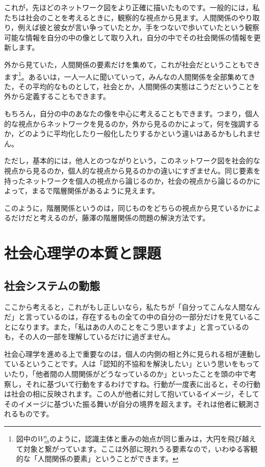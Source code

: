 \documentclass{ltjsbook}
\begin{document}
これが，先ほどのネットワーク図をより正確に描いたものです。一般的には，私たちは社会のことを考えるときに，観察的な視点から見ます。人間関係のやり取り，例えば彼と彼女が言い争っていたとか，手をつないで歩いていたという観察可能な情報を自分の中の像として取り入れ，自分の中でその社会関係の情報を更新します。

外から見ていた，人間関係の要素だけを集めて，これが社会だということもできます\footnote{図中の$W_{ab}^{a}$のように，認識主体と重みの始点が同じ重みは，大円を飛び越えて対象と繋がっています。ここは外部に現れうる要素なので，いわゆる客観的な「人間関係の要素」ということができます。}。あるいは，一人一人に聞いていって，みんなの人間関係を全部集めてきた，その平均的なものとして，社会とか，人間関係の実態はこうだということを外から定義することもできます。

もちろん，自分の中のあなたの像を中心に考えることもできます。つまり，個人的な視点からネットワークを見るのか，外から見るのかによって，何を強調するか，どのように平均化したり一般化したりするかという違いはあるかもしれません。

ただし，基本的には，他人とのつながりという，このネットワーク図を社会的な視点から見るのか，個人的な視点から見るのかの違いにすぎません。同じ要素を持ったネットワークを個人の視点から論じるのか，社会の視点から論じるのかによって，まるで階層関係があるように見えます。

このように，階層関係というのは，同じものをどちらの視点から見ているかによるだけだと考えるのが，藤澤の階層関係の問題の解決方法です。

\section{社会心理学の本質と課題}
\subsection{社会システムの動態}
ここから考えると，これがもし正しいなら，私たちが「自分ってこんな人間なんだ」と言っているのは，存在するもの全ての中の自分の一部分だけを見ていることになります。また，「私はあの人のことをこう思いますよ」と言っているのも，その人の一部を理解しているだけに過ぎません。

社会心理学を進める上で重要なのは，個人の内側の相と外に見られる相が連動しているということです。人は「認知的不協和を解決したい」という思いをもっていたり，「他者間の人間関係がどうなっているのか」といったことを頭の中で考察し，それに基づいて行動をするわけですね。行動が一度表に出ると，その行動は社会の相に反映されます。この人が他者に対して抱いているイメージ，そしてそのイメージに基づいた振る舞いが自分の境界を超えます。それは他者に観測されるものです。
\end{document}
